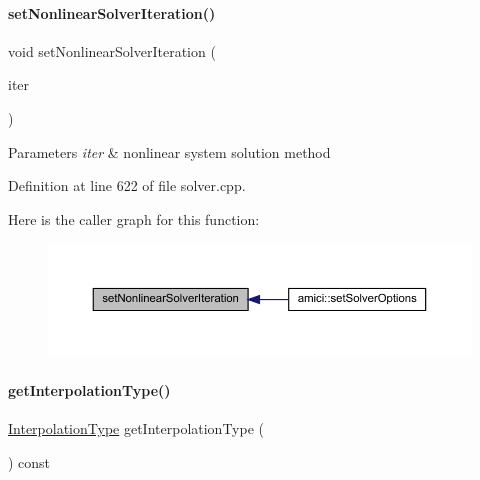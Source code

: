 \paragraph{\texorpdfstring{set\+Nonlinear\+Solver\+Iteration()}{setNonlinearSolverIteration()}}
{\footnotesize\ttfamily void set\+Nonlinear\+Solver\+Iteration (\begin{DoxyParamCaption}\item[{\mbox{\hyperlink{namespaceamici_a13388d34e4c35bb592c3e821c35cc923}{Nonlinear\+Solver\+Iteration}}}]{iter }\end{DoxyParamCaption})}


\begin{DoxyParams}{Parameters}
{\em iter} & nonlinear system solution method \\
\hline
\end{DoxyParams}


Definition at line 622 of file solver.\+cpp.

Here is the caller graph for this function\+:
\nopagebreak
\begin{figure}[H]
\begin{center}
\leavevmode
\includegraphics[width=350pt]{classamici_1_1_solver_a1dc7983f545ee95f7e6fb38cfb0b3286_icgraph}
\end{center}
\end{figure}
\mbox{\label{classamici_1_1_solver_a69568ccb5de1bcdd4344e105ddb12324}} 
\paragraph{\texorpdfstring{get\+Interpolation\+Type()}{getInterpolationType()}}
{\footnotesize\ttfamily \mbox{\hyperlink{namespaceamici_a8472f01c511d77bbfb981a46618ea1ea}{Interpolation\+Type}} get\+Interpolation\+Type (\begin{DoxyParamCaption}{ }\end{DoxyParamCaption}) const}

